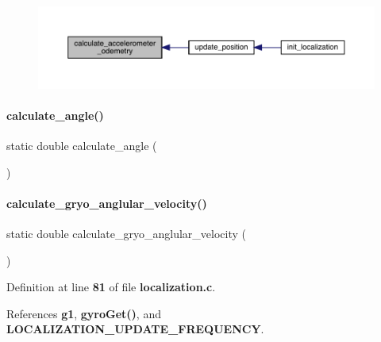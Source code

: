 \begin{figure}[H]
\begin{center}
\leavevmode
\includegraphics[width=350pt]{localization_8c_a6785e4b3b61887f28028f05019b9b39d_icgraph}
\end{center}
\end{figure}
\mbox{\label{localization_8c_a3774a84284eeb9f5efa7c23aa5ffcd9e}} 
\paragraph{calculate\+\_\+angle()}
{\footnotesize\ttfamily static double calculate\+\_\+angle (\begin{DoxyParamCaption}{ }\end{DoxyParamCaption})\hspace{0.3cm}{\ttfamily [static]}}

\mbox{\label{localization_8c_aa849dcc7cd296f4556fab3b57c1c4d3e}} 
\paragraph{calculate\+\_\+gryo\+\_\+anglular\+\_\+velocity()}
{\footnotesize\ttfamily static double calculate\+\_\+gryo\+\_\+anglular\+\_\+velocity (\begin{DoxyParamCaption}{ }\end{DoxyParamCaption})\hspace{0.3cm}{\ttfamily [static]}}



Definition at line \textbf{ 81} of file \textbf{ localization.\+c}.



References \textbf{ g1}, \textbf{ gyro\+Get()}, and \textbf{ L\+O\+C\+A\+L\+I\+Z\+A\+T\+I\+O\+N\+\_\+\+U\+P\+D\+A\+T\+E\+\_\+\+F\+R\+E\+Q\+U\+E\+N\+CY}.


